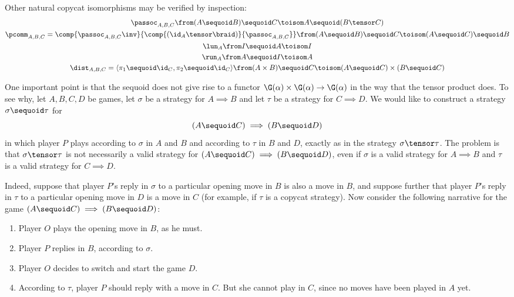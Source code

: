 \documentclass[11pt]{article} %
\begin{document}
Other natural copycat isomorphisms may be verified by inspection:
\begin{gather*}
  \passoc_{A,B,C} \from (A\sequoid B) \sequoid C \toisom A\sequoid (B\tensor C) \\
  \pcomm_{A,B,C} = \comp{\passoc_{A,B,C}\inv}{\comp{(\id_A\tensor\braid)}{\passoc_{A,B,C}}} \from (A\sequoid B)\sequoid C \toisom (A\sequoid C)\sequoid B\\
  \lun_A \from I\sequoid A \toisom I\\
  \run_A \from A\sequoid I \toisom A \\
  \dist_{A,B,C}=\langle \pi_1\sequoid\id_C,\pi_2\sequoid\id_C\rangle\from (A\times B)\sequoid C \toisom (A\sequoid C)\times(B\sequoid C)
\end{gather*}

One important point is that the sequoid does not give rise to a functor $\G(\alpha)\times\G(\alpha)\to\G(\alpha)$ in the way that the tensor product does.  To see why, let $A,B,C,D$ be games, let $\sigma$ be a strategy for $A\implies B$ and let $\tau$ be a strategy for $C\implies D$.  We would like to construct a strategy $\sigma\sequoid\tau$ for
\[
  (A\sequoid C)\implies (B\sequoid D)
  \]
in which player $P$ plays according to $\sigma$ in $A$ and $B$ and according to $\tau$ in $B$ and $D$, exactly as in the strategy $\sigma\tensor\tau$.  The problem is that $\sigma\tensor\tau$ is not necessarily a valid strategy for $(A\sequoid C)\implies (B\sequoid D)$, even if $\sigma$ is a valid strategy for $A\implies B$ and $\tau$ is a valid strategy for $C\implies D$.  

Indeed, suppose that player $P$'s reply in $\sigma$ to a particular opening move in $B$ is also a move in $B$, and suppose further that player $P$'s reply in $\tau$ to a particular opening move in $D$ is a move in $C$ (for example, if $\tau$ is a copycat strategy).  Now consider the following narrative for the game $(A\sequoid C)\implies (B\sequoid D)$:
\begin{enumerate}
  \item Player $O$ plays the opening move in $B$, as he must.
  \item Player $P$ replies in $B$, according to $\sigma$.  
  \item Player $O$ decides to switch and start the game $D$.
  \item According to $\tau$, player $P$ should reply with a move in $C$.  But she cannot play in $C$, since no moves have been played in $A$ yet.
\end{enumerate}
\end{document}
